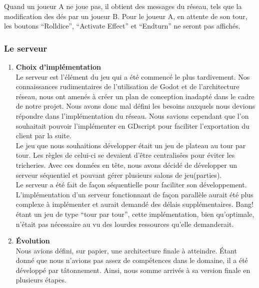 \documentclass[a4paper,11pt]{article}
\begin{document}
    Quand un joueur A ne joue pas, il obtient des messages du réseau, tels que la modification des dés par un joueur B. Pour le joueur A, en attente de son tour, les boutons “Rolldice”, “Activate Effect” et “Endturn” ne seront pas affichés.


\subsubsection{Le serveur}

\begin{enumerate}
	\item \textbf{Choix d'implémentation} \\
	
	Le serveur est l’élément du jeu qui a été commencé le plus tardivement. Nos connaissances rudimentaires de l’utilisation de Godot et de l’architecture réseau, nous ont amenés à créer un plan de conception inadapté dans le cadre de notre projet. Nous avons donc mal défini les besoins auxquels nous devions répondre dans l’implémentation du réseau. Nous savions cependant que l’on souhaitait pouvoir l'implémenter en GDscript pour faciliter l’exportation du client par la suite. \\
	
    Le jeu que nous souhaitions développer était un jeu de plateau au tour par tour. Les règles de celui-ci se devaient d'être centralisées pour éviter les tricheries. Avec ces données en tête, nous avons décidé de développer un serveur séquentiel et pouvant gérer plusieurs salons de jeu(parties).  \\

    Le serveur a été fait de façon séquentielle pour faciliter son développement. L’implémentation d’un serveur fonctionnant de façon parallèle aurait été plus complexe à implémenter et aurait demandé des délais supplémentaires. Bang! étant un jeu de type “tour par tour”, cette implémentation, bien qu'optimale, n’était pas nécessaire au vu des lourdes ressources qu’elle demanderait. \\

	
	\item \textbf{Évolution} \\
	
	Nous avions défini, sur papier, une architecture finale à atteindre. Étant donné que nous n’avions pas assez de compétences dans le domaine, il a été développé par tâtonnement.  Ainsi, nous somme arrivés à sa version finale en plusieurs étapes. \\
	

\end{enumerate}
\end{document}
